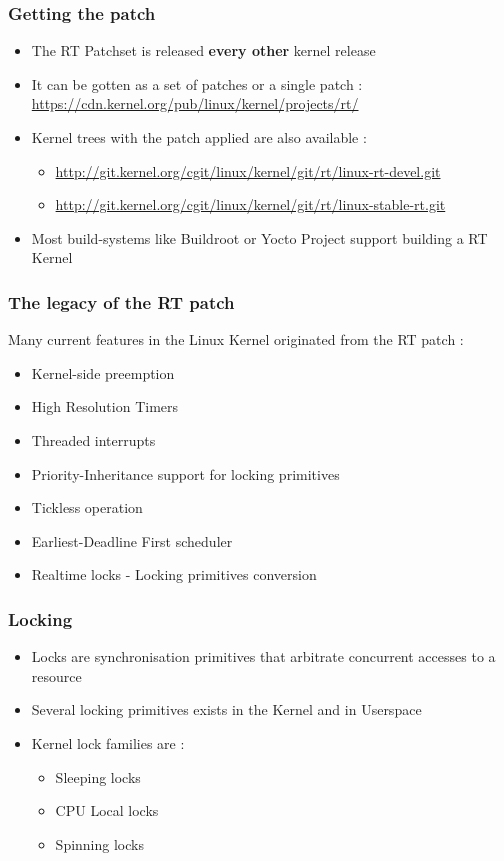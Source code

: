 \begin{frame}
  \frametitle{Getting the patch}
	\begin{itemize}
		\item The RT Patchset is released \textbf{every other} kernel release
		\item It can be gotten as a set of patches or a single patch : \\
			\url{https://cdn.kernel.org/pub/linux/kernel/projects/rt/}
		\item Kernel trees with the patch applied are also available :
			\begin{itemize}
				\item \url{http://git.kernel.org/cgit/linux/kernel/git/rt/linux-rt-devel.git}
				\item \url{http://git.kernel.org/cgit/linux/kernel/git/rt/linux-stable-rt.git}
			\end{itemize}
		\item Most build-systems like Buildroot or Yocto Project support building a RT Kernel
	\end{itemize}
\end{frame}

\begin{frame}
  \frametitle{The legacy of the RT patch}
  Many current features in the Linux Kernel originated from the RT patch :
	\begin{itemize}
		\item Kernel-side preemption
		\item High Resolution Timers
		\item Threaded interrupts
		\item Priority-Inheritance support for locking primitives
		\item Tickless operation
		\item Earliest-Deadline First scheduler
		\item Realtime locks - Locking primitives conversion
	\end{itemize}
\end{frame}


\begin{frame}
  \frametitle{Locking}
	\begin{itemize}
		\item Locks are synchronisation primitives that arbitrate concurrent accesses to a resource
		\item Several locking primitives exists in the Kernel and in Userspace
		\item Kernel lock families are :
			\begin{itemize}
				\item Sleeping locks
				\item CPU Local locks
				\item Spinning locks
			\end{itemize}
	\end{itemize}
\end{frame}

